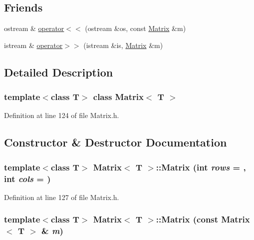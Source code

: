\subsection*{Friends}
\begin{DoxyCompactItemize}
\item 
ostream \& \hyperlink{classMatrix_a5ed9a90fd6f010e7e9840a17d92d5361}{operator$<$$<$} (ostream \&os, const \hyperlink{classMatrix}{Matrix} \&m)
\item 
istream \& \hyperlink{classMatrix_afcea9fa7d9a5052070fe1fda963ef237}{operator$>$$>$} (istream \&is, \hyperlink{classMatrix}{Matrix} \&m)
\end{DoxyCompactItemize}


\subsection{Detailed Description}
\subsubsection*{template$<$class T$>$ class Matrix$<$ T $>$}



Definition at line 124 of file Matrix.h.



\subsection{Constructor \& Destructor Documentation}
\hypertarget{classMatrix_a3ebbc04812668005b87e5c0cf28fa4ac}{
\subsubsection[{Matrix}]{\setlength{\rightskip}{0pt plus 5cm}template$<$class T$>$ {\bf Matrix}$<$ T $>$::{\bf Matrix} (int {\em rows} = {}, \/  int {\em cols} = {})}}
\label{classMatrix_a3ebbc04812668005b87e5c0cf28fa4ac}


Definition at line 127 of file Matrix.h.

\hypertarget{classMatrix_a3796b4f32dc8e11f908a90fd3dd39c45}{
\subsubsection[{Matrix}]{\setlength{\rightskip}{0pt plus 5cm}template$<$class T$>$ {\bf Matrix}$<$ T $>$::{\bf Matrix} (const {\bf Matrix}$<$ T $>$ \& {\em m})}}
\label{classMatrix_a3796b4f32dc8e11f908a90fd3dd39c45}


